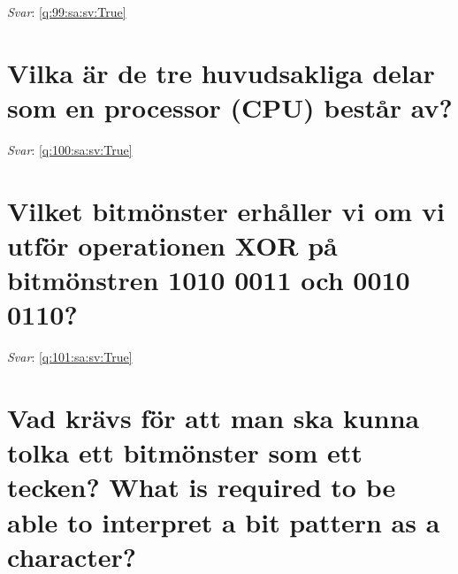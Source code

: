 \documentclass[a4paper,11pt,oneside]{book}
\begin{document}
\begin{sloppypar}
\vspace{2cm}

\noindent\makebox[\textwidth]{\hrulefill}

\vspace{1cm}

\textit{Svar}: \autoref{q:99:sa:sv:True}



\section{Vilka \"ar de tre huvudsakliga delar som en processor (CPU) best\r{a}r av?}

\label{q:100:sa:sv:False}

\vspace{2cm}

\noindent\makebox[\textwidth]{\hrulefill}

\vspace{1cm}

\textit{Svar}: \autoref{q:100:sa:sv:True}



\section{Vilket bitm\"onster erh\r{a}ller vi om vi utf\"or operationen XOR p\r{a} bitm\"onstren 1010 0011 och 0010 0110?}

\label{q:101:sa:sv:False}

\vspace{2cm}

\noindent\makebox[\textwidth]{\hrulefill}

\vspace{1cm}

\textit{Svar}: \autoref{q:101:sa:sv:True}



\section{Vad kr\"avs f\"or att man ska kunna tolka ett bitm\"onster som ett tecken? What is required to be able to interpret a bit pattern as a character?}

\label{q:102:sa:sv:False}

\vspace{2cm}

\noindent\makebox[\textwidth]{\hrulefill}

\vspace{1cm}


\end{sloppypar}
\end{document}
